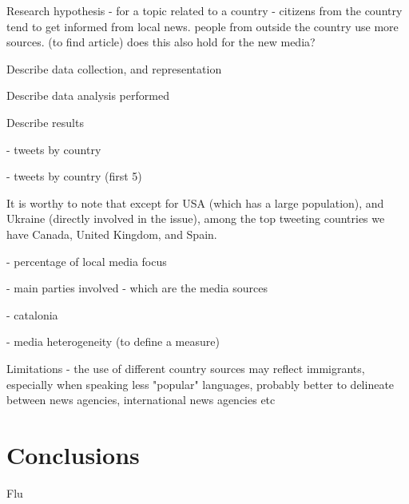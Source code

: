 \documentclass{acm_proc_10ptArticle-sp}
\begin{document}
Research hypothesis - for a topic related to a country - citizens from the country tend to get informed from local news. people from outside the country use more sources. (to find article) does this also hold for the new media?

Describe data collection, and representation

Describe data analysis performed

Describe results

- tweets by country

- tweets by country (first 5)

It is worthy to note that except for USA (which has a large population), and Ukraine (directly involved in the issue), among the top tweeting countries we have Canada, United Kingdom, and Spain. 

- percentage of local media focus

- main parties involved - which are the media sources

- catalonia

- media heterogeneity (to define a measure)

Limitations - the use of different country sources may reflect immigrants, especially when speaking less "popular" languages, probably better to delineate between news agencies, international news agencies etc

\section{Conclusions}
Flu



\end{document}
